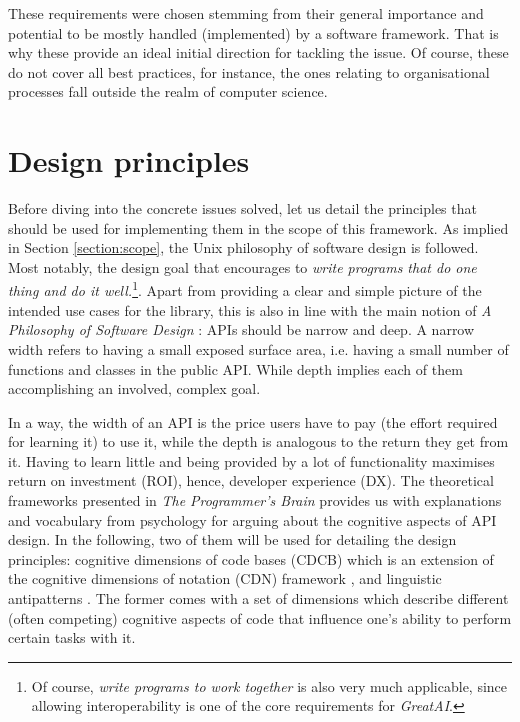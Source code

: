 These requirements were chosen stemming from their general importance and potential to be mostly handled (implemented) by a software framework. That is why these provide an ideal initial direction for tackling the issue. Of course, these do not cover all best practices, for instance, the ones relating to organisational processes fall outside the realm of computer science.

\section{Design principles}

Before diving into the concrete issues solved, let us detail the principles that should be used for implementing them in the scope of this framework. As implied in Section \ref{section:scope}, the Unix philosophy \cite{ritchie1978unix,salus1994quarter} of software design is followed. Most notably, the design goal that encourages to \textit{write programs that do one thing and do it well.}\footnote{Of course, \textit{write programs to work together} is also very much applicable, since allowing interoperability is one of the core requirements for \textit{GreatAI}.}. Apart from providing a clear and simple picture of the intended use cases for the library, this is also in line with the main notion of \textit{A Philosophy of Software Design} \cite{ousterhout2018philosophy}: APIs should be narrow and deep. A narrow width refers to having a small exposed surface area, i.e. having a small number of functions and classes in the public API. While depth implies each of them accomplishing an involved, complex goal. 

In a way, the width of an API is the price users have to pay (the effort required for learning it) to use it, while the depth is analogous to the return they get from it. Having to learn little and being provided by a lot of functionality maximises return on investment (ROI), hence, developer experience (DX). The theoretical frameworks presented in \textit{The Programmer's Brain} \cite{hermans2021programmer} provides us with explanations and vocabulary from psychology for arguing about the cognitive aspects of API design. In the following, two of them will be used for detailing the design principles: cognitive dimensions of code bases (CDCB) which is an extension of the cognitive dimensions of notation (CDN) framework \cite{blackwell2001cognitive}, and linguistic antipatterns \cite{arnaoudova2016linguistic}. The former comes with a set of dimensions which describe different (often competing) cognitive aspects of code that influence one's ability to perform certain tasks with it.

